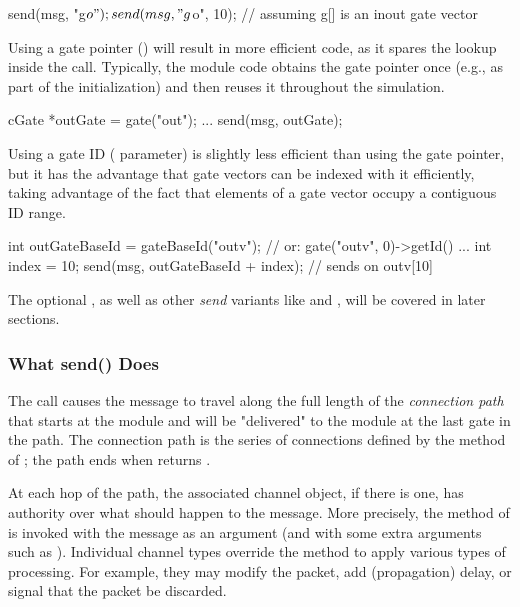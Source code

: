 \begin{cpp}
send(msg, "g$o");
send(msg, "g$o", 10); // assuming g[] is an inout gate vector
\end{cpp}

Using a gate pointer () will result in more efficient code, as it
spares the lookup inside the  call. Typically, the module code
obtains the gate pointer once (e.g., as part of the initialization) and then
reuses it throughout the simulation.

\begin{cpp}
cGate *outGate = gate("out");
...
send(msg, outGate);
\end{cpp}

Using a gate ID ( parameter) is slightly less efficient than using
the gate pointer, but it has the advantage that gate vectors can be indexed with
it efficiently, taking advantage of the fact that elements of a gate vector occupy
a contiguous ID range.

\begin{cpp}
int outGateBaseId = gateBaseId("outv"); // or: gate("outv", 0)->getId()
...
int index = 10;
send(msg, outGateBaseId + index); // sends on outv[10]
\end{cpp}

The optional , as well as other \textit{send} variants like
 and , will be covered in later sections.

\subsubsection{What send() Does}
\label{sec:simple-modules:what-send-does}

The  call causes the message to travel along the full length of
the \textit{connection path} that starts at the module and will be
"delivered" to the module at the last gate in the path. The connection path is
the series of connections defined by the  method of
; the path ends when  returns .

At each hop of the path, the associated channel object, if there is one, has
authority over what should happen to the message. More precisely, the
 method of  is invoked with the message
as an argument (and with some extra arguments such as ).
Individual channel types override the  method to apply
various types of processing. For example, they may modify the packet, add
(propagation) delay, or signal that the packet be discarded.

